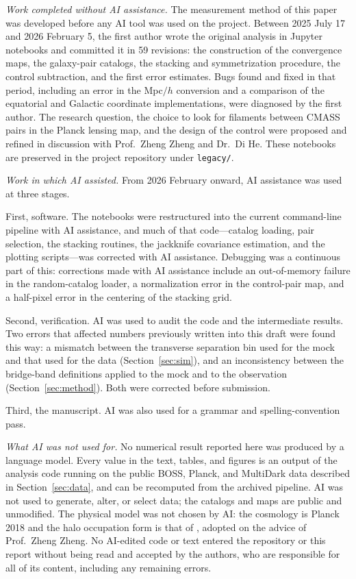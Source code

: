 \documentclass[11pt,letterpaper]{article}
\begin{document}
\emph{Work completed without AI assistance.} The measurement method of this
paper was developed before any AI tool was used on the project. Between
2025 July 17 and 2026 February 5, the first author wrote the original analysis
in Jupyter notebooks and committed it in 59 revisions: the construction of the
convergence maps, the galaxy-pair catalogs, the stacking and symmetrization
procedure, the control subtraction, and the first error estimates. Bugs found
and fixed in that period, including an error in the Mpc$/h$ conversion and a
comparison of the equatorial and Galactic coordinate implementations, were
diagnosed by the first author. The research question, the choice to look for
filaments between CMASS pairs in the Planck lensing map, and the design of the
control were proposed and refined in discussion with Prof.\ Zheng Zheng and
Dr.\ Di He. These notebooks are preserved in the project repository under
\texttt{legacy/}.

\emph{Work in which AI assisted.} From 2026 February onward, AI assistance was
used at three stages.

First, software. The notebooks were restructured into the current command-line
pipeline with AI assistance, and much of that code---catalog loading, pair
selection, the stacking routines, the jackknife covariance estimation, and the
plotting scripts---was corrected with AI assistance. Debugging was a continuous
part of this: corrections made with AI assistance include an out-of-memory failure
in the random-catalog loader, a normalization error in the control-pair map, and a
half-pixel error in the centering of the stacking grid.

Second, verification. AI was used to audit the code and the intermediate
results. Two errors that affected numbers previously written into this draft
were found this way: a mismatch between the transverse separation bin used for
the mock and that used for the data (Section~\ref{sec:sim}), and an
inconsistency between the bridge-band definitions applied to the mock and to
the observation (Section~\ref{sec:method}). Both were corrected before
submission.

Third, the manuscript. AI was also used for a grammar and spelling-convention pass.

\emph{What AI was not used for.} No numerical result reported here was produced
by a language model. Every value in the text, tables, and figures is an output
of the analysis code running on the public BOSS, Planck, and MultiDark data
described in Section~\ref{sec:data}, and can be recomputed from the archived
pipeline. AI was not used to generate, alter, or select data; the catalogs and
maps are public and unmodified. The physical model was not chosen by AI: the
cosmology is Planck 2018 and the halo occupation form is that of
\citet{White2011}, adopted on the advice of Prof.\ Zheng Zheng. No AI-edited
code or text entered the repository or this report without being read and
accepted by the authors, who are responsible for all of its content, including
any remaining errors.
\end{document}
